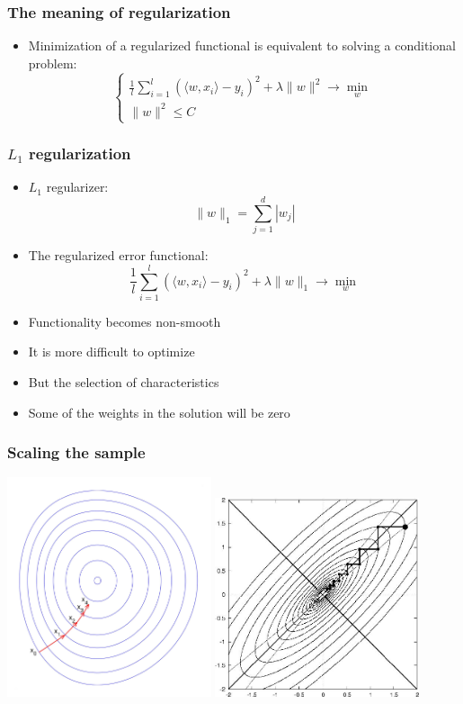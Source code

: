 \documentclass[default]{beamer}
\begin{document}
	\begin{frame}	
		\frametitle{The meaning of regularization}
		\Large
		\begin{itemize}
			\item Minimization of a regularized functional is equivalent to solving a conditional problem:
			\[
				\begin{cases}
					\frac{1}{l}\sum_{i=1}^l (\langle w,x_i\rangle-y_i)^2+\lambda \|w\|^2\rightarrow\min_w\\
					\|w\|^2\leq C
				\end{cases}
			\]
		\end{itemize}
	\end{frame}

	\begin{frame}	
		\frametitle{$L_1$ regularization}
		\Large
		\begin{itemize}
			\item $L_1$ regularizer:
			\[
				\|w\|_1=\sum_{j=1}^d |w_j|
			\]
			\item The regularized error functional:
			\[
			\frac{1}{l}\sum_{i=1}^l (\langle w,x_i\rangle-y_i)^2+\lambda \|w\|_1\rightarrow\min_w
			\]
			\item Functionality becomes non-smooth
			\item It is more difficult to optimize
			\item But the selection of characteristics
			\item Some of the weights in the solution will be zero
		\end{itemize}
	\end{frame}

	\begin{frame}	
		\frametitle{Scaling the sample}
		
		\centering
		\includegraphics[width=0.45\textwidth]{linear_21.jpg}
		\includegraphics[width=0.45\textwidth]{linear_38.jpg}
	\end{frame}
\end{document}
